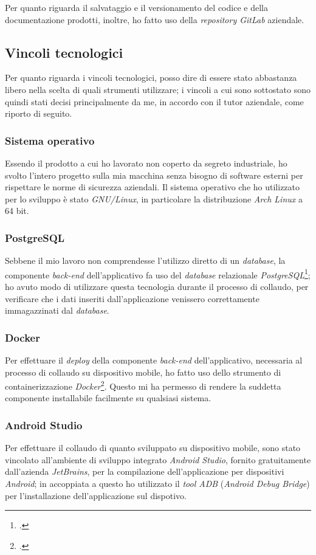 Per quanto riguarda il salvataggio e il versionamento del codice e della documentazione prodotti, inoltre, ho fatto uso della \textit{repository GitLab} aziendale.

\subsection{Vincoli tecnologici}

Per quanto riguarda i vincoli tecnologici, posso dire di essere stato abbastanza libero nella scelta di quali strumenti utilizzare; i vincoli a cui sono sottostato sono quindi stati decisi principalmente da me, in accordo con il tutor aziendale, come riporto di seguito.

\subsubsection*{Sistema operativo}

Essendo il prodotto a cui ho lavorato non coperto da segreto industriale, ho svolto l'intero progetto sulla mia macchina senza bisogno di software esterni per rispettare le norme di sicurezza aziendali. Il sistema operativo che ho utilizzato per lo sviluppo è stato \textit{GNU/Linux}, in particolare la distribuzione \textit{Arch Linux} a 64 bit.

\subsubsection*{PostgreSQL}
Sebbene il mio lavoro non comprendesse l'utilizzo diretto di un \textit{database}, la componente \textit{back-end} dell'applicativo fa uso del \textit{database} relazionale \textit{PostgreSQL}\footcite{tec:postgres}; ho avuto modo di utilizzare questa tecnologia durante il processo di collaudo, per verificare che i dati inseriti dall'applicazione venissero correttamente immagazzinati dal \textit{database}.

\subsubsection*{Docker}
Per effettuare il \textit{deploy} della componente \textit{back-end} dell'applicativo, necessaria al processo di collaudo su dispositivo mobile, ho fatto uso dello strumento di containerizzazione \textit{Docker}\footcite{tec:docker}. Questo mi ha permesso di rendere la suddetta componente installabile facilmente su qualsiasi sistema.

\subsubsection*{Android Studio}
Per effettuare il collaudo di quanto sviluppato su dispositivo mobile, sono stato vincolato all'ambiente di sviluppo integrato \textit{Android Studio}, fornito gratuitamente dall'azienda \textit{JetBrains}, per la compilazione dell'applicazione per dispositivi \textit{Android}; in accoppiata a questo ho utilizzato il \textit{tool ADB} (\textit{Android Debug Bridge}) per l'installazione dell'applicazione sul dispotivo.

